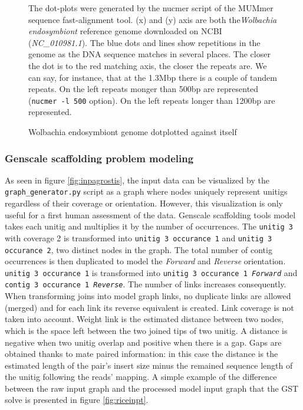 \documentclass[12pt]{article}
\begin{document}
\begin{figure}[h!]
\begin{center}
{\begin{tikzpicture}
\end{tikzpicture}
}
\end{center}
\caption{Wolbachia endosymbiont genome dotplotted against itself}
{\footnotesize The dot-plots were generated by the nucmer script of the MUMmer sequence fast-alignment tool. (x) and (y) axis are both the\textit{Wolbachia endosymbiont} reference genome downloaded on NCBI 
(\textit{NC\_010981.1}). The blue dots and lines show repetitions in the genome as the DNA sequence matches in several places. The closer the dot is to the red matching axis, the closer the repeats are. We can say, for instance, that at the 1.3Mbp there is a couple of tandem repeats. On the left repeats monger than 500bp are represented (\texttt{nucmer -l 500} option). On the left repeats longer than 1200bp are represented.}
\label{fig:wolbarepeats}
\end{figure}
\newpage

\subsubsection{Genscale scaffolding problem modeling} \label{sec:gstmodeling}
As seen in figure \ref{fig:inpagrostis}, the input data can be visualized by the \texttt{graph\_generator.py} script as a graph where nodes uniquely represent unitigs regardless of their coverage or orientation. However, this visualization is only useful for a first human assessment of the data. 
Genscale scaffolding tools model takes each unitig and multiplies it by the number of occurrences. The \texttt{unitig 3} with coverage 2 is transformed into \texttt{unitig 3 occurance 1} and \texttt{unitig 3 occurance 2}, two distinct nodes in the graph. The total number of contig occurrences is then duplicated to model the \textit{Forward} and \textit{Reverse} orientation. \texttt{unitig 3 occurance 1} is transformed into \texttt{unitig 3 occurance 1 \textit{Forward}} and \texttt{contig 3 occurance 1 \textit{Reverse}}. The number of links increases consequently. When transforming joins into model graph links, no duplicate links are allowed (merged) and for each link its reverse equivalent is created. Link coverage is not taken into account. Weight link is the estimated distance between two nodes, which is the space left between the two joined tips of two unitig. A distance is negative when two unitig overlap and positive when there is a gap. Gaps are obtained thanks to mate paired information: in this case the distance is the estimated length of the pair's insert size minus the remained sequence length of the unitig following the reads' mapping. A simple example of the difference between the raw input graph and the processed model input graph that the GST solve is presented in figure \ref{fig:riceinpt}.
\end{document}
